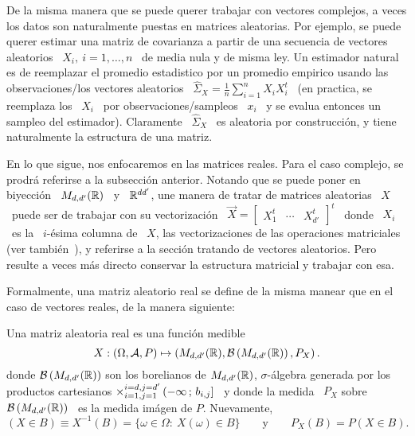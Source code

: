 

\label{Ssec:MP:MA}

De la misma manera que se  puede querer trabajar con vectores complejos, a veces
los datos son naturalmente puestas en matrices aleatorias. Por ejemplo, se puede
querer estimar  una matriz de covarianza  a partir de una  secuencia de vectores
aleatorios \  $X_i, \: i =  1, \ldots ,  n$ \ de media  nula y de misma  ley. Un
estimador  natural es  de reemplazar  el  promedio estadistico  por un  promedio
empirico usando las  observaciones/los vectores aleatorios \ $\widehat{\Sigma}_X
= \frac1n \sum_{i=1}^n X_i X_i^t$ \ (en practica, se reemplaza los \ $X_i$ \ por
observaciones/sampleos  \  $x_i$   \  y  se  evalua  entonces   un  sampleo  del
estimador). Claramente \ $\widehat{\Sigma}_X$ \ es aleatoria por construcci\'on,
y tiene naturalmente la estructura de una matriz.

En lo que sigue, nos enfocaremos  en las matrices reales. Para el caso complejo,
se prodr\'a referirse a la subsecci\'on  anterior. Notando que se puede poner en
biyecci\'on \  $M_{d,d'}(\mathbb{R})$ \ y \  $\mathbb{R}^{d d'}$, une manera  de tratar de
matrices  aleatorias \  $X$ \  puede ser  de trabajar  con su  vectorizaci\'on \
$\vec{X} = \begin{bmatrix} X_1^t &  \cdots & X_{d'}^t \end{bmatrix}^t$ \ donde \
$X_i$  \ es  la  \ $i$-\'esima  columna de  \  $X$, las  vectorizaciones de  las
operaciones   matriciales~\cite[Cap.~2]{MagNeu}  (ver  tambi\'en~\cite{MagNeu79,
  NeuWan83, Har08}), y referirse a la secci\'on tratando de vectores aleatorios.
Pero resulte a veces m\'as  directo conservar la estructura matricial y trabajar
con esa.

Formalmente, una  matriz aleatorio real se define  de la misma manear  que en el
caso de vectores reales, de la manera siguiente:
%
\begin{definicion}
\label{Def:MP:MatrizAleatorioaReal}
%
  Una matriz aleatoria real es una funci\'on medible
  \[
  X:  (\Omega,\mathcal{A},P) \mapsto  \left( M_{d,d'}(\mathbb{R})  ,  \mathcal{B}\left( M_{d,d'}(\mathbb{R})
    \right) , P_X \right).
  \]
  donde   $\mathcal{B}\left(    M_{d,d'}(\mathbb{R})   \right)$   son    los   borelianos   de
  $M_{d,d'}(\mathbb{R})$, $\sigma$-\'algebra  generada por los  productos cartesianos
  $\operatorname*{\times}_{i=1,j=1}^{i=d,j=d'}  \left( -\infty \,  ; \,  b_{i,j} \right]$  \ y
  donde la  medida \ $P_X$  sobre \ $\mathcal{B}\left(  M_{d,d'}(\mathbb{R}) \right)$ \  es la
  medida im\'agen de $P$. Nuevamente,
  \[
  (X \in  B) \equiv  X^{-1}(B) =  \{ \omega \in  \Omega: \:  X(\omega) \in  B \}
  \qquad \mbox{y} \qquad P_X(B) = P(X \in B).
  \]
\end{definicion}

